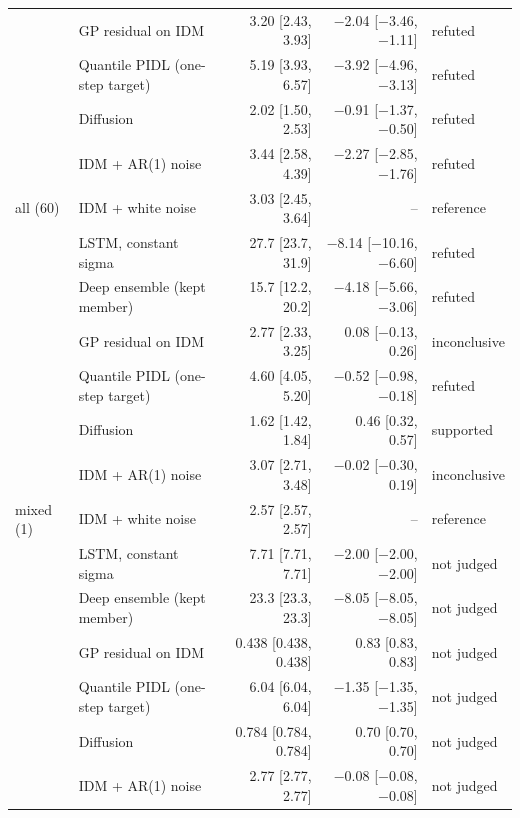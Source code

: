 \begin{table}[htbp]
\begin{tabular}{llrrl}
 & GP residual on IDM & 3.20 [2.43, 3.93] & $-$2.04 [$-$3.46, $-$1.11] & refuted \\
 & Quantile PIDL (one-step target) & 5.19 [3.93, 6.57] & $-$3.92 [$-$4.96, $-$3.13] & refuted \\
 & Diffusion & 2.02 [1.50, 2.53] & $-$0.91 [$-$1.37, $-$0.50] & refuted \\
 & IDM + AR(1) noise & 3.44 [2.58, 4.39] & $-$2.27 [$-$2.85, $-$1.76] & refuted \\
\midrule
all (60) & IDM + white noise & 3.03 [2.45, 3.64] & -- & reference \\
 & LSTM, constant sigma & 27.7 [23.7, 31.9] & $-$8.14 [$-$10.16, $-$6.60] & refuted \\
 & Deep ensemble (kept member) & 15.7 [12.2, 20.2] & $-$4.18 [$-$5.66, $-$3.06] & refuted \\
 & GP residual on IDM & 2.77 [2.33, 3.25] & 0.08 [$-$0.13, 0.26] & inconclusive \\
 & Quantile PIDL (one-step target) & 4.60 [4.05, 5.20] & $-$0.52 [$-$0.98, $-$0.18] & refuted \\
 & Diffusion & 1.62 [1.42, 1.84] & 0.46 [0.32, 0.57] & supported \\
 & IDM + AR(1) noise & 3.07 [2.71, 3.48] & $-$0.02 [$-$0.30, 0.19] & inconclusive \\
\midrule
mixed (1) & IDM + white noise & 2.57 [2.57, 2.57] & -- & reference \\
 & LSTM, constant sigma & 7.71 [7.71, 7.71] & $-$2.00 [$-$2.00, $-$2.00] & not judged \\
 & Deep ensemble (kept member) & 23.3 [23.3, 23.3] & $-$8.05 [$-$8.05, $-$8.05] & not judged \\
 & GP residual on IDM & 0.438 [0.438, 0.438] & 0.83 [0.83, 0.83] & not judged \\
 & Quantile PIDL (one-step target) & 6.04 [6.04, 6.04] & $-$1.35 [$-$1.35, $-$1.35] & not judged \\
 & Diffusion & 0.784 [0.784, 0.784] & 0.70 [0.70, 0.70] & not judged \\
 & IDM + AR(1) noise & 2.77 [2.77, 2.77] & $-$0.08 [$-$0.08, $-$0.08] & not judged \\
\bottomrule
\end{tabular}
\end{table}

